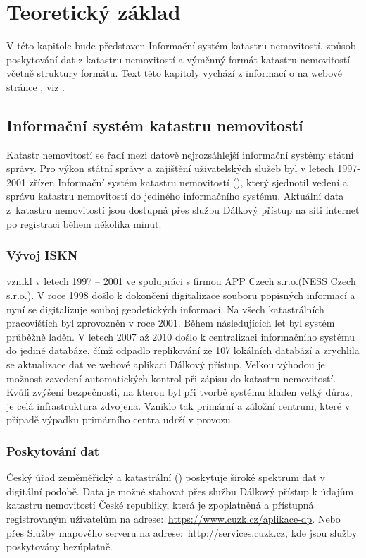 \chapter{Teoretický základ}
\label{2-teorie}

V této kapitole bude představen Informační systém katastru
nemovitostí, způsob poskytování dat z katastru nemovitostí a výměnný
formát katastru nemovitostí včetně struktury formátu. Text této
kapitoly vychází z informací o  na webové stránce
, viz \cite{iskn}.

\section{Informační systém katastru nemovitostí}
Katastr nemovitostí se řadí mezi datově nejrozsáhlejší informační
systémy státní správy. Pro výkon státní správy a zajištění
uživatelských služeb byl v letech 1997-2001 zřízen Informační systém
katastru nemovitostí (), který sjednotil vedení a správu
katastru nemovitostí do jediného informačního systému. Aktuální data
z~katastru nemovitostí jsou dostupná přes službu Dálkový přístup na
síti internet po registraci během několika minut.
\subsection{Vývoj ISKN}
 vznikl v letech 1997 -- 2001 ve spolupráci s firmou APP
Czech s.r.o.(NESS Czech s.r.o.). V roce 1998 došlo k dokončení
digitalizace souboru popisných informací a nyní se digitalizuje souboj
geodetických informací. Na všech katastrálních pracovištích byl
 zprovozněn v roce 2001. Během následujících let byl systém
průběžně laděn. V letech 2007 až 2010 došlo k centralizaci
informačního systému do jediné databáze, čímž odpadlo replikování ze
107 lokálních databází a zrychlila se aktualizace dat ve webové
aplikaci Dálkový přístup. Velkou výhodou  je možnost zavedení
automatických kontrol při zápisu do katastru nemovitostí. Kvůli
zvýšení bezpečnosti, na kterou byl při tvorbě systému kladen velký
důraz, je celá infrastruktura zdvojena. Vzniklo tak primární a záložní
centrum, které v případě výpadku primárního centra udrží  v
provozu.
\subsection{Poskytování dat}
Český úřad zeměměřický a katastrální () poskytuje široké
spektrum dat v digitální podobě. Data je možné stahovat přes službu
Dálkový přístup k údajům katastru nemovitostí České republiky, která
je zpoplatněná a přístupná registrovaným uživatelům na
adrese:~\href{https://www.cuzk.cz/aplikace-dp}{https://www.cuzk.cz/aplikace-dp}. Nebo
přes Služby mapového serveru na
adrese:~\href{http://services.cuzk.cz/}{http://services.cuzk.cz}, kde
jsou služby poskytovány bezúplatně.

